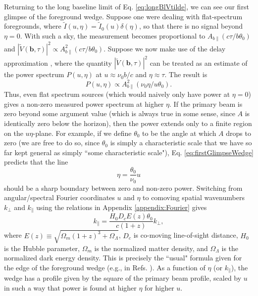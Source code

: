 \documentclass[twocolumn,aps,prd,nofootinbib,showpacs]{revtex4-1}
\begin{document}
Returning to the long baseline limit of  Eq. \eqref{eq:longBlVtilde}, we can see our first glimpse of the foreground wedge.  Suppose one were dealing with flat-spectrum foregrounds, where $\widetilde{I}(u,\eta) = \widetilde{I}_0 (u) \delta(\eta)$, so that there is no signal beyond $\eta=0$.  With such a sky, the measurement becomes proportional to $A_{b\parallel} ( c \tau / b \theta_0 ) $ and $| \widetilde{V} (\mathbf{b}, \tau) |^2 \propto A_{b\parallel}^2 ( c \tau / b \theta_0 )$.  Suppose we now make use of the delay approximation \cite{Parsons2012b}, where the quantity $| \widetilde{V} (\mathbf{b}, \tau) |^2$ can be treated as an estimate of the power spectrum $P(u,\eta)$ at $u \approx \nu_0 b/c$ and $\eta \approx \tau$.  The result is
\begin{equation}
\label{eq:firstGlimpseWedge}
P(u,\eta) \propto A_{b\parallel}^2 ( \nu_0 \eta / u \theta_0 ).
\end{equation}
Thus, even flat spectrum sources (which would naively only have power at $\eta=0$) gives a non-zero measured power spectrum at higher $\eta$.  If the primary beam is zero beyond some argument value (which is always true in some sense, since $A$ is identically zero below the horizon), then the power extends only to a finite region on the $u\eta$-plane.  For example, if we define $\theta_0$ to be the angle at which $A$ drops to zero (we are free to do so, since $\theta_0$ is simply a characteristic scale that we have so far kept general as simply ``some characteristic scale"),  Eq. \eqref{eq:firstGlimpseWedge} predicts that the line
\begin{equation}
\eta = \frac{\theta_0}{\nu_0} u
\end{equation}
should be a sharp boundary between zero and non-zero power.  Switching from angular/spectral Fourier coordinates $u$ and $\eta$ to comoving spatial wavenumbers $k_\perp$ and $k_\parallel$ using the relations in Appendix \ref{appendix:Fourier} gives
\begin{equation}
\label{eq:CosmologicalCoordsWedge}
k_\parallel = \frac{H_0 D_c E(z) \theta_0}{c (1+z)} k_\perp,
\end{equation}
where $E(z) \equiv \sqrt{\Omega_m (1+z)^3 + \Omega_\Lambda}$, $D_c$ is co-moving line-of-sight distance, $H_0$ is the Hubble parameter, $\Omega_m$ is the normalized matter density, and $\Omega_\Lambda$ is the normalized dark energy density.  This is precisely the ``usual" formula given for the edge of the foreground wedge (e.g., in Refs. \cite{Morales2012,Trott2012,Parsons2012b,Dillon2014}).  As a function of $\eta$ (or $k_\parallel$), the wedge has a profile given by the square of the primary beam profile, scaled by $u$ in such a way that power is found at higher $\eta$ for higher $u$.
\end{document}
